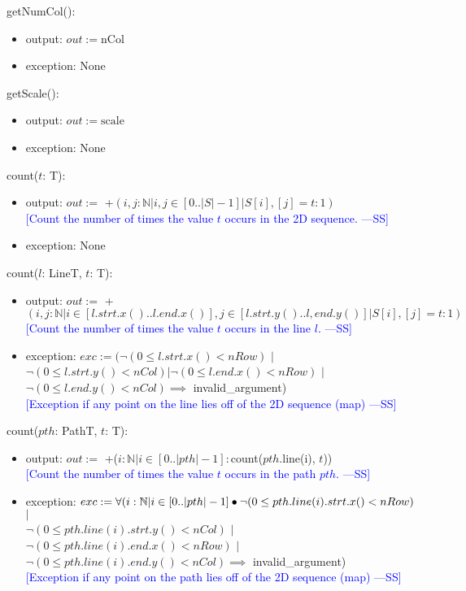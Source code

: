 \documentclass[12pt]{article}
\newcommand{\authornote}[3]{\textcolor{#1}{[#3 ---#2]}}
\newcommand{\authornote}[3]{}
\newcommand{\wss}[1]{\authornote{blue}{SS}{#1}}
\begin{document}
\noindent getNumCol():
\begin{itemize}
\item output: $out := \mbox{nCol}$
\item exception: None
\end{itemize}

\noindent getScale():
\begin{itemize}
\item output: $out := \mbox{scale}$
\item exception: None
\end{itemize}

\noindent count($t$: T):
\begin{itemize}
\item output: $out :=$ +$(i,j:\mathbb{N}|i,j\in[0..|S| - 1]|S[i],[j] = t:1)$\\
\wss{Count the number of times the value $t$ occurs in the 2D
    sequence.}
\item exception: None
\end{itemize}

\noindent count($l$: LineT, $t$: T):
\begin{itemize}
\item output: $out :=$ +$(i,j:\mathbb{N}|i\in[l.strt.x()..l.end.x()],j\in[l.strt.y()..l,end.y()]|S[i],[j] = t:1)$\\
\wss{Count the number of times the value $t$ occurs in the line
    $l$.}
\item exception: $exc := (\lnot(0 \leq l.strt.x() < nRow)$ $|$ $\lnot(0 \leq l.strt.y() < nCol)|\lnot(0 \leq l.end.x() < nRow)$ $|$ $\lnot(0 \leq l.end.y() < nCol) \implies$ invalid\_argument)\\
\wss{Exception if any point on the line lies off of the 2D
    sequence (map)}
\end{itemize}

\noindent count($\mathit{pth}$: PathT, $t$: T):
\begin{itemize}
\item output: $out :=$ +($i:\mathbb{N}|i\in[0..|pth|-1]:$count($pth$.line(i), $t$))\\
\wss{Count the number of times the value $t$ occurs in the path
    $pth$.}
\item exception: $exc := \forall(i:\mathbb{N}|i\in[0..|pth|-1] \bullet \\\lnot(0 \leq pth.line(i).strt.x() < nRow)$ $|$ \\$\lnot(0 \leq pth.line(i).strt.y() < nCol)$ $|$ \\$\lnot(0 \leq pth.line(i).end.x() < nRow)$ $|$ \\$\lnot(0 \leq pth.line(i).end.y() < nCol) \implies$ invalid\_argument)\\
\wss{Exception if any point on the path lies off of the 2D
    sequence (map)}
\end{itemize}
\end{document}
